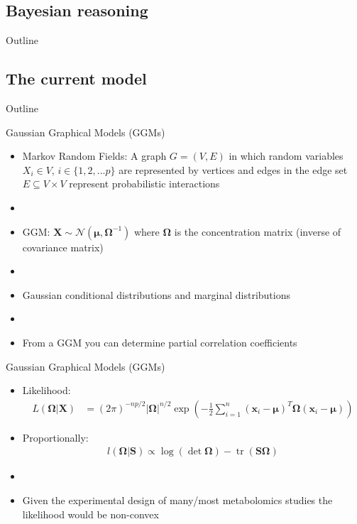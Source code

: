 \documentclass[xcolor=dvipsnames]{beamer}
\DeclareMathOperator{\tr}{tr}
\begin{document}
\subsection{Bayesian reasoning}
\begin{frame}{Outline}
	\vspace{-10.5pt}
	\tableofcontents[currentsection,subsectionstyle=show/shaded/hide]
\end{frame}

\subsection{The current model}
\begin{frame}{Outline}
	\vspace{-10.5pt}
	\tableofcontents[currentsection,subsectionstyle=show/shaded/hide]
\end{frame}

\begin{frame}{Gaussian Graphical Models (GGMs)}
	\vspace{-5.5pt}
	\begin{itemize}
		\item Markov Random Fields: A graph $G=(V,E)$ in which random variables $X_i\in V$, $i\in \{1,2,...p\}$ are represented by vertices and edges in the edge set $E \subseteq V \times V$ represent probabilistic interactions
		\item[]
		\item GGM: $\textbf{X}\sim \mathcal{N}(\boldsymbol{\mu},\boldsymbol{\Omega}^{-1})$ where $\boldsymbol{\Omega}$ is the concentration matrix (inverse of covariance matrix)
		\item[]
		\item Gaussian conditional distributions and marginal distributions
		\item[]
		\item From a GGM you can determine partial correlation coefficients 
	\end{itemize}
\end{frame}

\begin{frame}{Gaussian Graphical Models (GGMs)}
	\vspace{-15.5pt}
	\begin{itemize}
		\item Likelihood:
		\begin{align*}
		L(\boldsymbol{\Omega}|\textbf{X})&=(2 \pi)^{-np/2}|\boldsymbol{\Omega}|^{n/2} \exp \left(-\frac{1}{2}\sum_{i=1}^{n} (\textbf{x}_i-\boldsymbol{\mu})^T \boldsymbol{\Omega} (\textbf{x}_i-\boldsymbol{\mu})\right) 
		\end{align*}
		\item Proportionally:
		\begin{align*} 
		l(\boldsymbol{\Omega}|\textbf{S})\propto\log (\det \boldsymbol{\Omega})-\tr \left( \textbf{S} \boldsymbol{\Omega} \right)
		\end{align*}
		\item[]
		\item Given the experimental design of many/most metabolomics studies the likelihood would be non-convex
	\end{itemize}
\end{frame}
\end{document}
